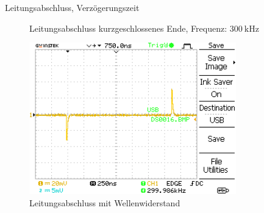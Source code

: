 \documentclass[ngerman]{scrartcl}
\theoremstyle{definition}
\begin{document}
\begin{aufgabe}{Leitungsabschluss, Verzögerungszeit}
\begin{unteraufgabe}
\begin{figure}[H]
					\caption{Leitungsabschluss kurzgeschlossenes Ende, Frequenz: $\SI{300}{\kilo\hertz}$}
					\label{fig:DS0015}
				\end{figure}
				\begin{figure}[H]
					\centering
					\includegraphics[width=0.8\textwidth]{MesswerteVersuch1/DS0016.png}	

					\caption{Leitungsabschluss mit Wellenwiderstand}
					\label{fig:DS0016}
				\end{figure}
			\end{unteraufgabe}
		\end{aufgabe}
\clearpage
\end{document}
